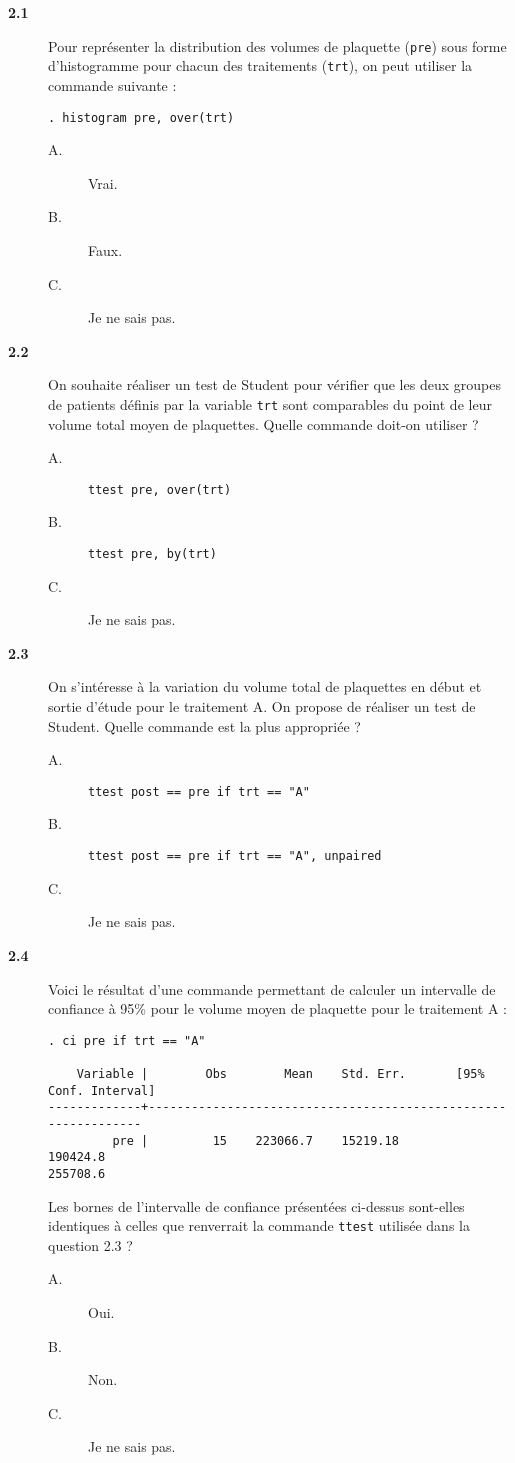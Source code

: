 \begin{description}
\item[\bf 2.1] Pour représenter la distribution des volumes de plaquette
  (\texttt{pre}) sous forme d'histogramme pour chacun des traitements
  (\texttt{trt}), on peut utiliser la commande suivante : 
\begin{verbatim}
. histogram pre, over(trt)
\end{verbatim}
  \begin{description}
  \item[A.] Vrai.
  \item[B.] Faux.
  \item[C.] Je ne sais pas.
  \end{description}
\item[\bf 2.2] On souhaite réaliser un test de Student pour vérifier que les
  deux groupes de patients définis par la variable \texttt{trt} sont
  comparables du point de leur volume total moyen de plaquettes. Quelle
  commande doit-on utiliser ?  
  \begin{description}
  \item[A.] \verb|ttest pre, over(trt)|
  \item[B.] \verb|ttest pre, by(trt)|
  \item[C.] Je ne sais pas.
  \end{description}
\item[\bf 2.3] On s'intéresse à la variation du volume total de plaquettes
  en début et sortie d'étude pour le traitement A. On propose de réaliser un
  test de Student. Quelle commande est la plus appropriée ? 
  \begin{description}
  \item[A.] \verb|ttest post == pre if trt == "A"|
  \item[B.] \verb|ttest post == pre if trt == "A", unpaired|
  \item[C.] Je ne sais pas.
  \end{description}
\item[\bf 2.4] Voici le résultat d'une commande permettant de calculer un
  intervalle de confiance à 95\% pour le volume moyen de plaquette pour le
  traitement A : 
\begin{verbatim}
. ci pre if trt == "A"

    Variable |        Obs        Mean    Std. Err.       [95% Conf. Interval]
-------------+---------------------------------------------------------------
         pre |         15    223066.7    15219.18        190424.8
255708.6
\end{verbatim}
  Les bornes de l'intervalle de confiance présentées ci-dessus sont-elles
  identiques à celles que renverrait la commande \texttt{ttest} utilisée
  dans la question 2.3 ?
  \begin{description}
  \item[A.] Oui.
  \item[B.] Non.
  \item[C.] Je ne sais pas.
  \end{description}
\end{description}

